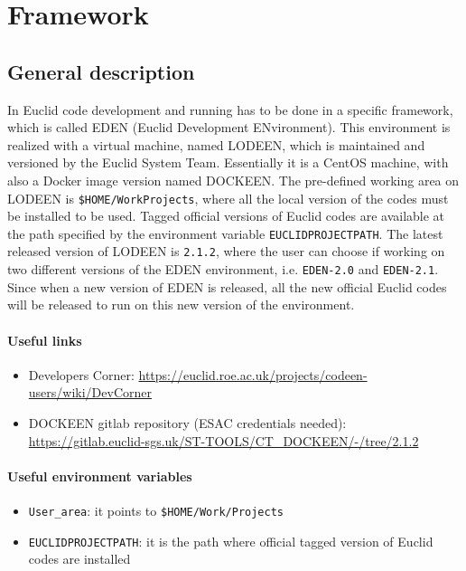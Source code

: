\section{Framework}\label{sec:framework}
\subsection{General description}
In Euclid code development and running has to be done in a specific framework, which is called EDEN (Euclid Development ENvironment). This environment is realized with a virtual machine, named LODEEN, which is maintained and versioned by the Euclid System Team. Essentially it is a CentOS machine, with also a Docker image version named DOCKEEN. The pre-defined working area on LODEEN is \verb+$HOME/WorkProjects+, where all the local version of the codes must be installed to be used. Tagged official versions of Euclid codes are available at the path specified by the environment variable \verb+EUCLIDPROJECTPATH+. The latest released version of LODEEN is \verb+2.1.2+, where the user can choose if working on two different versions of the EDEN environment, i.e. \verb+EDEN-2.0+ and \verb+EDEN-2.1+. Since when a new version of EDEN is released, all the new official Euclid codes will be released to run on this new version of the environment.

\paragraph{Useful links}
\begin{itemize}
\item Developers Corner: \url{https://euclid.roe.ac.uk/projects/codeen-users/wiki/DevCorner}
\item DOCKEEN gitlab repository (ESAC credentials needed): \url{https://gitlab.euclid-sgs.uk/ST-TOOLS/CT_DOCKEEN/-/tree/2.1.2}
\end{itemize}

\paragraph{Useful environment variables}
\begin{itemize}
\item \verb+User_area+: it points to \verb+$HOME/Work/Projects+
\item \verb+EUCLIDPROJECTPATH+: it is the path where official tagged version of Euclid codes are installed
\end{itemize}


